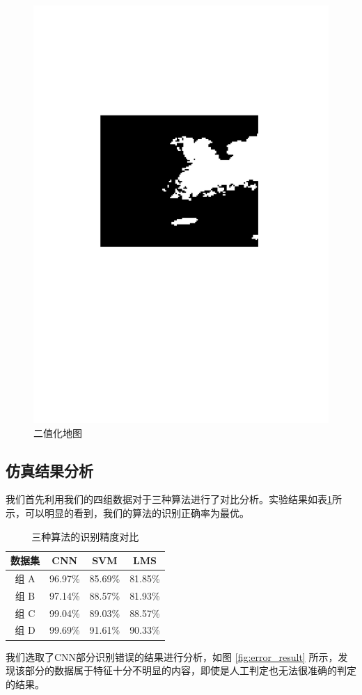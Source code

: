 \begin{figure}[H]
	\centering
	\includegraphics[height=0.25\textheight]{figures/othr/binary}
	\caption{二值化地图}
	\label{fig:binary}
\end{figure}

\subsection{仿真结果分析}
我们首先利用我们的四组数据对于三种算法进行了对比分析。实验结果如表\ref{tab:methods}所示，可以明显的看到，我们的算法的识别正确率为最优。
\begin{table}[H]
	\renewcommand{\arraystretch}{1.3}
	\caption{三种算法的识别精度对比}
	\label{tab:methods}
	\centering
	\begin{tabular}{c|ccc}
		\hline
		数据集 & CNN & SVM & LMS \\
		\hline
		组 A  & 96.97\% & 85.69\% & 81.85\% \\
		组 B & 97.14\% & 88.57\% & 81.93\% \\
		组 C & 99.04\% & 89.03\% & 88.57\% \\
		组 D  & 99.69\% & 91.61\% & 90.33\% \\
		\hline
	\end{tabular}
\end{table}
我们选取了CNN部分识别错误的结果进行分析，如图 \ref{fig:error_result} 所示，发现该部分的数据属于特征十分不明显的内容，即使是人工判定也无法很准确的判定的结果。

